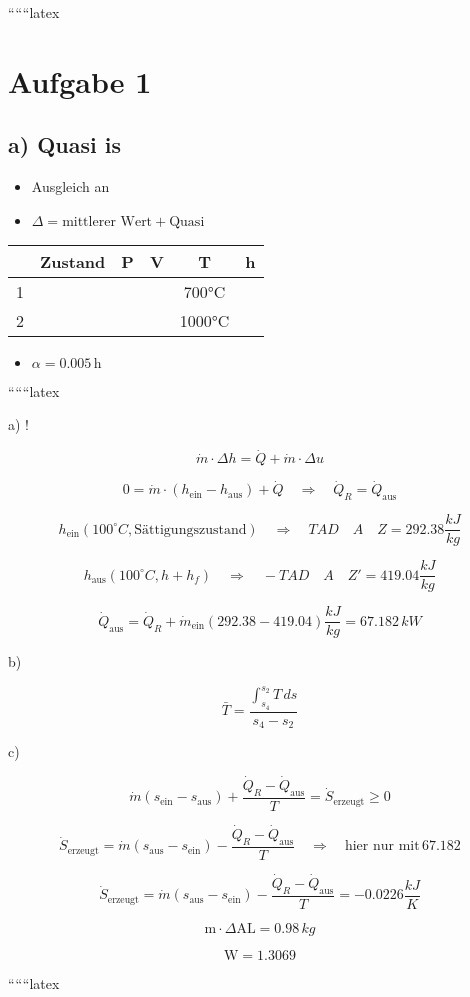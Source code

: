 
``````latex


\section*{Aufgabe 1}

\subsection*{a) Quasi is}
\begin{itemize}
    \item Ausgleich an 
    \item $\Delta = \text{mittlerer Wert} + \text{Quasi}$
\end{itemize}

\begin{tabular}{|c|c|c|c|c|c|}
    \hline
    & Zustand & P & V & T & h \\
    \hline
    1 & & & & 700°C & \\
    \hline
    2 & & & & 1000°C & \\
    \hline
\end{tabular}

\begin{itemize}
    \item $\alpha = 0.005 \, \text{h}$
\end{itemize}

``````latex


a) !

\[
\dot{m} \cdot \Delta h = \dot{Q} + \dot{m} \cdot \Delta u
\]

\[
0 = \dot{m} \cdot (h_{\text{ein}} - h_{\text{aus}}) + \dot{Q} \quad \Rightarrow \quad \dot{Q}_R = \dot{Q}_{\text{aus}}
\]

\[
h_{\text{ein}} (100^\circ C, \text{Sättigungszustand}) \quad \Rightarrow \quad TAD \quad A \quad Z = 292.38 \frac{kJ}{kg}
\]

\[
h_{\text{aus}} (100^\circ C, h + h_f) \quad \Rightarrow \quad -TAD \quad A \quad Z' = 419.04 \frac{kJ}{kg}
\]

\[
\dot{Q}_{\text{aus}} = \dot{Q}_R + \dot{m}_{\text{ein}} (292.38 - 419.04) \frac{kJ}{kg} = 67.182 \, kW
\]

b) 

\[
\bar{T} = \frac{\int_{s_4}^{s_2} T \, ds}{s_4 - s_2}
\]

c) 

\[
\dot{m} (s_{\text{ein}} - s_{\text{aus}}) + \frac{\dot{Q}_R - \dot{Q}_{\text{aus}}}{T} = \dot{S}_{\text{erzeugt}} \geq 0
\]

\[
\dot{S}_{\text{erzeugt}} = \dot{m} (s_{\text{aus}} - s_{\text{ein}}) - \frac{\dot{Q}_R - \dot{Q}_{\text{aus}}}{T} \quad \Rightarrow \quad \text{hier nur mit} \, 67.182
\]

\[
\dot{S}_{\text{erzeugt}} = \dot{m} (s_{\text{aus}} - s_{\text{ein}}) - \frac{\dot{Q}_R - \dot{Q}_{\text{aus}}}{T} = -0.0226 \frac{kJ}{K}
\]

\[
\text{m} \cdot \Delta \text{AL} = 0.98 \, kg
\]

\[
\text{W} = 1.3069
\]

``````latex


